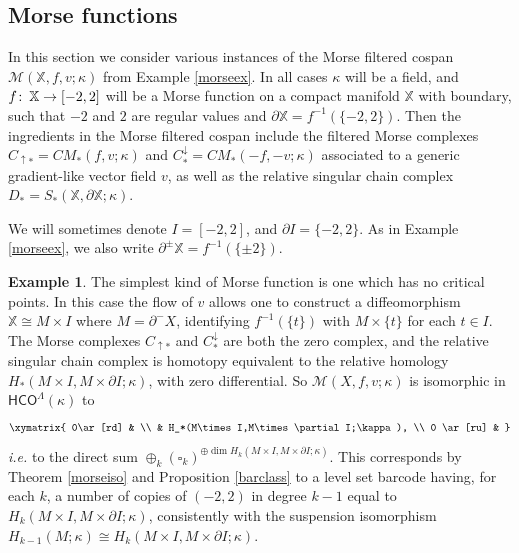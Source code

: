 \documentclass[11pt]{amsart}
\theoremstyle{definition}
\newtheorem{ex}[theorem]{Example}
\theoremstyle{remark}
\numberwithin{equation}{section}
\def\co{\colon\thinspace}
\begin{document}
\subsection{Morse functions}

In this section we consider various instances of the Morse filtered cospan $\mathcal{M}(\mathbb{X},f,v;\kappa)$ from Example \ref{morseex}. In all cases $\kappa$ will be a field, and $f\co \mathbb{X}\to [-2,2]$ will be a Morse function on a compact manifold $\mathbb{X}$ with boundary, such that $-2$ and $2$ are regular values and $\partial \mathbb{X}=f^{-1}(\{-2,2\})$.
Then the ingredients in the Morse filtered cospan include the filtered Morse complexes $C_{\uparrow *}=CM_*(f,v;\kappa)$ and $C^{\downarrow}_{*}=CM_*(-f,-v;\kappa)$ associated to a generic gradient-like vector field $v$, as well as the relative singular chain complex 
$D_*=S_*(\mathbb{X},\partial\mathbb{X};\kappa)$.  

We will sometimes denote $I=[-2,2]$, and $\partial I=\{-2,2\}$.  As in Example \ref{morseex}, we also write $\partial^{\pm}\mathbb{X}=f^{-1}(\{\pm 2\})$.

\begin{ex}\label{trivmorse}
The simplest kind of Morse function is one which has no critical points.  In this case the flow of $v$ allows one to construct a diffeomorphism $\mathbb{X}\cong  M\times I$ where $M=\partial^-X$, identifying $f^{-1}(\{t\})$ with $M\times \{t\}$ for each $t\in I$.  The Morse complexes $C_{\uparrow *}$ and $C^{\downarrow}_{*}$ are both the zero complex, and the relative singular chain complex is homotopy equivalent to the relative homology $H_*(M\times I,M\times \partial I;\kappa)$, with zero differential.
 So $\mathcal{M}(X,f,v;\kappa)$ is isomorphic in $\mathsf{HCO}^{\Lambda}(\kappa)$ to \[ \xymatrix{ 0\ar[rd] & \\ & H_*(M\times I,M\times \partial I;\kappa), \\ 0 \ar[ru] &  } \] \emph{i.e.} to the direct sum $\oplus_{k}\left(\square_k\right)^{\oplus \dim  H_k(M\times I,M\times \partial I;\kappa)}$.  This corresponds by Theorem \ref{morseiso} and Proposition \ref{barclass} to a level set barcode having, for each $k$, a number of copies of $(-2,2)$ in degree $k-1$ equal to   $H_k(M\times I,M\times \partial I;\kappa)$, consistently with the suspension isomorphism $H_{k-1}(M;\kappa)\cong H_k(M\times I,M\times \partial I;\kappa)$. 
\end{ex}
\end{document}
